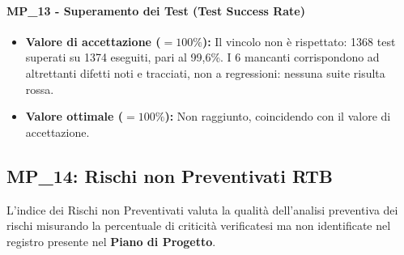 \documentclass[12pt, a4paper]{article}
\begin{document}
\paragraph*{MP\_13 - Superamento dei Test (Test Success Rate)}
\begin{itemize}
    \item \textbf{Valore di accettazione ($= 100\%$):} Il vincolo non è rispettato: 1368 test superati su 1374 eseguiti, pari al 99,6\%. I 6 mancanti corrispondono ad altrettanti difetti noti e tracciati, non a regressioni: nessuna suite risulta rossa.
    \item \textbf{Valore ottimale ($= 100\%$):} Non raggiunto, coincidendo con il valore di accettazione.
\end{itemize}

\subsection{MP\_14: Rischi non Preventivati RTB}
L'indice dei Rischi non Preventivati valuta la qualità dell’analisi preventiva dei rischi misurando la percentuale di criticità verificatesi ma non identificate nel registro presente nel \textbf{Piano di Progetto}.
\end{document}
